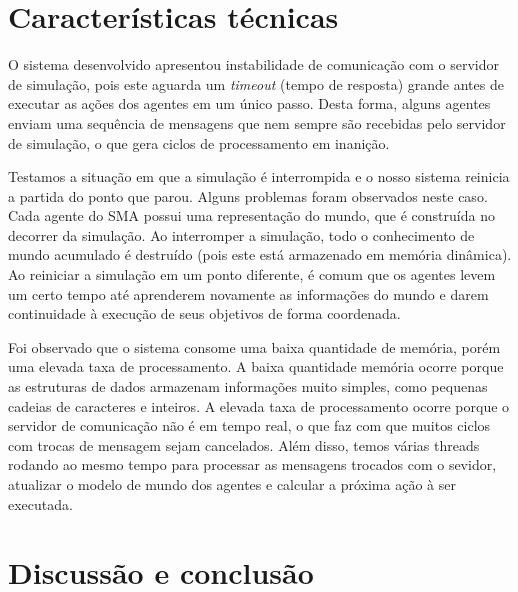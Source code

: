 \documentclass{llncs}
\begin{document}
\section{Características técnicas}


O sistema desenvolvido apresentou instabilidade de comunicação com o servidor de simulação, pois este aguarda um \textit{timeout} (tempo de resposta) grande antes de executar as ações dos agentes em um único passo. Desta forma, alguns agentes enviam uma sequência de mensagens que nem sempre são recebidas pelo servidor de simulação, o que gera ciclos de processamento em inanição.

Testamos a situação em que a simulação é interrompida e o nosso sistema reinicia a partida do ponto que parou. Alguns problemas foram observados neste caso. Cada agente do SMA possui uma representação do mundo, que é construída no decorrer da simulação. Ao interromper a simulação, todo o conhecimento de mundo acumulado é destruído (pois este está armazenado em memória dinâmica). Ao reiniciar a simulação em um ponto diferente, é comum que os agentes levem um certo tempo até aprenderem novamente as informações do mundo e darem continuidade à execução de seus objetivos de forma coordenada.

Foi observado que o sistema consome uma baixa quantidade de memória, porém uma elevada taxa de processamento. A baixa quantidade memória ocorre porque as estruturas de dados armazenam informações muito simples, como pequenas cadeias de caracteres e inteiros. A elevada taxa de processamento ocorre porque o servidor de comunicação não é em tempo real, o que faz com que muitos ciclos com trocas de mensagem sejam cancelados. Além disso, temos várias threads rodando ao mesmo tempo para processar as mensagens trocados com o sevidor, atualizar o modelo de mundo dos agentes e calcular a próxima ação à ser executada. 


\section{Discussão e conclusão}

\end{document}
